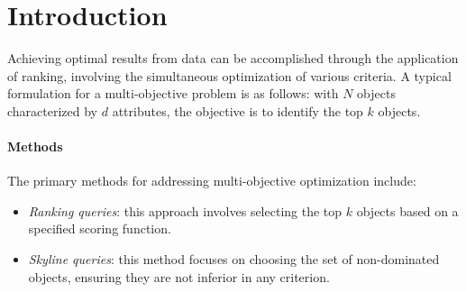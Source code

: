\section{Introduction}

Achieving optimal results from data can be accomplished through the application of ranking, involving the simultaneous optimization of various criteria.
A typical formulation for a multi-objective problem is as follows: with $N$ objects characterized by $d$ attributes, the objective is to identify the top $k$ objects.

\paragraph*{Methods}
The primary methods for addressing multi-objective optimization include:
\begin{itemize}
    \item \textit{Ranking queries}: this approach involves selecting the top $k$ objects based on a specified scoring function.
    \item \textit{Skyline queries}: this method focuses on choosing the set of non-dominated objects, ensuring they are not inferior in any criterion.
\end{itemize}